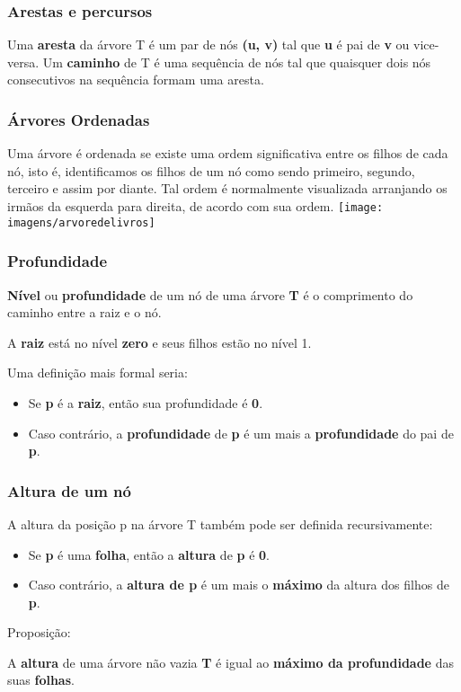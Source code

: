 \documentclass{beamer}
\begin{document}
\begin{frame}
\frametitle{Arestas e percursos}
Uma \textbf{aresta} da árvore T é um par de nós \textbf{(u, v)} tal que \textbf{u} é pai de \textbf{v} ou vice-versa. Um \textbf{caminho} de T é uma sequência de nós tal que quaisquer dois nós consecutivos na sequência formam uma aresta.
\end{frame}

\begin{frame}
\frametitle{Árvores Ordenadas}
Uma árvore é ordenada se existe uma ordem significativa entre os filhos de cada nó, isto é, identificamos os filhos de um nó como sendo primeiro, segundo, terceiro e assim por diante. Tal ordem é normalmente visualizada arranjando os irmãos da esquerda para direita, de acordo com sua ordem.
\texttt{[image: imagens/arvoredelivros]}
\end{frame}







\begin{frame}
\frametitle{Profundidade}
\textbf{Nível} ou \textbf{profundidade} de um nó de uma árvore \textbf{T} é o comprimento do caminho entre a raiz e o nó.

A \textbf{raiz} está no nível \textbf{zero} e seus filhos estão no nível 1.

Uma definição mais formal seria:
\begin{itemize}
\item Se \textbf{p} é a \textbf{raiz}, então sua profundidade é \textbf{0}.
\item Caso contrário, a \textbf{profundidade} de \textbf{p} é um mais a \textbf{profundidade} do pai de \textbf{p}.
\end{itemize}
\end{frame}

\begin{frame}
\frametitle{Altura de um nó}

A altura da posição p na árvore T também pode ser definida recursivamente:
\begin{itemize}
\item Se \textbf{p} é uma \textbf{folha}, então a \textbf{altura} de \textbf{p} é \textbf{0}.
\item Caso contrário, a \textbf{altura de p} é um mais o \textbf{máximo} da altura dos filhos de \textbf{p}.
\end{itemize}

Proposição:

A \textbf{altura} de uma árvore não vazia \textbf{T} é igual ao \textbf{máximo da profundidade} das suas \textbf{folhas}.
\end{frame}
\end{document}

